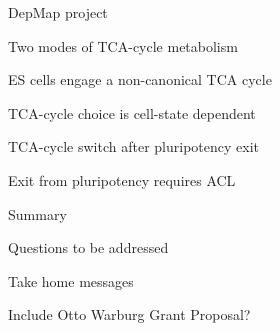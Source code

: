 \documentclass[10pt, aspectratio=169]{beamer}
\begin{document}
\begin{frame}{DepMap project}

\end{frame}

\begin{frame}{Two modes of TCA-cycle metabolism}

\end{frame}

\begin{frame}{ES cells engage a non-canonical TCA cycle}

\end{frame}

\begin{frame}{TCA-cycle choice is cell-state dependent}

\end{frame}

\begin{frame}{TCA-cycle switch after pluripotency exit}

\end{frame}

\begin{frame}{Exit from pluripotency requires ACL}

\end{frame}

\begin{frame}{Summary}

\end{frame}

\begin{frame}{Questions to be addressed}

\end{frame}

\begin{frame}{Take home messages}

Include Otto Warburg Grant Proposal?
\end{frame}
\end{document}
